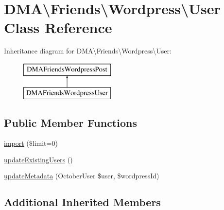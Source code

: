 \hypertarget{classDMA_1_1Friends_1_1Wordpress_1_1User}{\section{D\-M\-A\textbackslash{}Friends\textbackslash{}Wordpress\textbackslash{}User Class Reference}
\label{classDMA_1_1Friends_1_1Wordpress_1_1User}
}
Inheritance diagram for D\-M\-A\textbackslash{}Friends\textbackslash{}Wordpress\textbackslash{}User\-:\begin{figure}[H]
\begin{center}
\leavevmode
\includegraphics[height=2.000000cm]{dd/d73/classDMA_1_1Friends_1_1Wordpress_1_1User}
\end{center}
\end{figure}
\subsection*{Public Member Functions}
\begin{DoxyCompactItemize}
\item 
\hyperlink{classDMA_1_1Friends_1_1Wordpress_1_1User_ab33f393b12ecbd1a7a274a041006348f}{import} (\$limit=0)
\item 
\hyperlink{classDMA_1_1Friends_1_1Wordpress_1_1User_a9664b94f73cb6ed82746b94d9bdac91b}{update\-Existing\-Users} ()
\item 
\hyperlink{classDMA_1_1Friends_1_1Wordpress_1_1User_aa2d2c2c9b82db76a0eab7af41629e011}{update\-Metadata} (October\-User \$user, \$wordpress\-Id)
\end{DoxyCompactItemize}
\subsection*{Additional Inherited Members}


